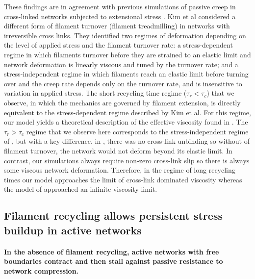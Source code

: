 \documentclass[10pt,letterpaper]{article}
\begin{document}
These findings are in agreement with previous simulations of passive creep in cross-linked networks subjected to extensional stress  \cite{Kim2014526} .  Kim et al considered  a different form of filament turnover (filament treadmilling) in networks with irreversible cross links. They identified two regimes of deformation depending on the level of applied stress and the filament turnover rate: a stress-dependent regime in which filaments turnover before they are strained to an elastic limit and network deformation is linearly viscous and tuned by the turnover rate; and a stress-independent regime in which filaments reach an elastic limit before turning over and the creep rate depends only on the turnover rate, and is insensitive to variation in applied stress. The short recycling time regime ($\tau_r < \tau_c$) that we observe, in which the mechanics are governed by filament extension, is directly equivalent to the stress-dependent regime described by Kim et al. For this regime, our model yields a theoretical description of the effective viscosity found in \cite{Kim2014526}. The $\tau_r > \tau_c$ regime that we observe here corresponds to the stress-independent regime of \cite{Kim2014526}, but with a key difference.   in \cite{Kim2014526}, there was no cross-link unbinding so without of filament turnover, the network would not deform beyond its elastic limit. In contrast, our simulations always require non-zero cross-link slip so there is always some viscous network deformation. Therefore, in the regime of long recycling times our model approaches the limit of cross-link dominated viscosity whereas the model of \cite{Kim2014526} approached an infinite viscosity limit.






\subsection*{Filament recycling allows persistent stress buildup in active networks}

\paragraph{In the absence of filament recycling, active networks with free boundaries contract and then stall against passive resistance to network compression.}
\end{document}
